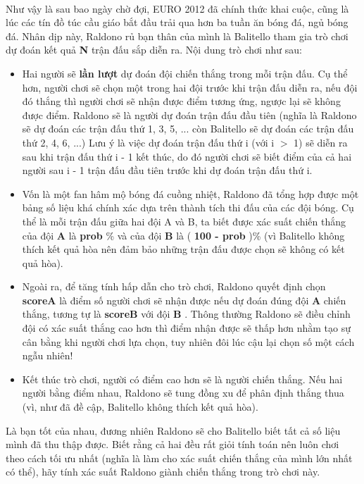  

Như vậy là sau bao ngày chờ đợi, EURO 2012 đã chính thức khai cuộc, cũng là lúc các tín đồ túc cầu giáo bắt đầu trải qua hơn ba tuần ăn bóng đá, ngủ bóng đá. Nhân dịp này, Raldono rủ bạn thân của mình là Balitello tham gia trò chơi dự đoán kết quả \textbf{ N } trận đấu sắp diễn ra. Nội dung trò chơi như sau:
\begin{itemize}
	\item Hai người sẽ \textbf{ lần lượt } dự đoán đội chiến thắng trong mỗi trận đấu. Cụ thể hơn, người chơi sẽ chọn một trong hai đội trước khi trận đấu diễn ra, nếu đội đó thắng thì người chơi sẽ nhận được điểm tương ứng, ngược lại sẽ không được điểm. Raldono sẽ là người dự đoán trận đấu đầu tiên (nghĩa là Raldono sẽ dự đoán các trận đấu thứ 1, 3, 5, ... còn Balitello sẽ dự đoán các trận đấu thứ 2, 4, 6, ...) Lưu ý là việc dự đoán trận đấu thứ i (với i $>$ 1) sẽ diễn ra sau khi trận đấu thứ i - 1 kết thúc, do đó người chơi sẽ biết điểm của cả hai người sau i - 1 trận đấu đầu tiên trước khi dự đoán trận đấu thứ i.
\end{itemize}
\begin{itemize}
	\item Vốn là một fan hâm mộ bóng đá cuồng nhiệt, Raldono đã tổng hợp được một bảng số liệu khá chính xác dựa trên thành tích thi đấu của các đội bóng. Cụ thể là mỗi trận đấu giữa hai đội A và B, ta biết được xác suất chiến thắng của đội \textbf{ A } là \textbf{ prob } \% và của đội \textbf{ B } là ( \textbf{ 100 - prob } )\% (vì Balitello không thích kết quả hòa nên đảm bảo những trận đấu được chọn sẽ không có kết quả hòa).
\end{itemize}
\begin{itemize}
	\item Ngoài ra, để tăng tính hấp dẫn cho trò chơi, Raldono quyết định chọn \textbf{ scoreA } là điểm số người chơi sẽ nhận được nếu dự đoán đúng đội \textbf{ A } chiến thắng, tương tự là \textbf{ scoreB } với đội \textbf{ B } . Thông thường Raldono sẽ điều chỉnh đội có xác suất thắng cao hơn thì điểm nhận được sẽ thấp hơn nhằm tạo sự cân bằng khi người chơi lựa chọn, tuy nhiên đôi lúc cậu lại chọn số một cách ngẫu nhiên!
\end{itemize}
\begin{itemize}
	\item Kết thúc trò chơi, người có điểm cao hơn sẽ là người chiến thắng. Nếu hai người bằng điểm nhau, Raldono sẽ tung đồng xu để phân định thắng thua (vì, như đã đề cập, Balitello không thích kết quả hòa).
\end{itemize}
\begin{itemize}
\end{itemize}

Là bạn tốt của nhau, đương nhiên Raldono sẽ cho Balitello biết tất cả số liệu mình đã thu thập được. Biết rằng cả hai đều rất giỏi tính toán nên luôn chơi theo cách tối ưu nhất (nghĩa là làm cho xác suất chiến thắng của mình lớn nhất có thể), hãy tính xác suất Raldono giành chiến thắng trong trò chơi này.
